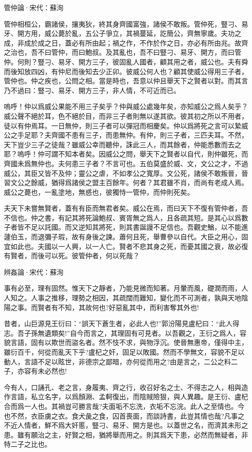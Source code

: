 \documentclass[12pt,a4paper]{ctexbook}
\begin{document}
管仲論·宋代：蘇洵 \par
管仲相桓公，霸諸侯，攘夷狄，終其身齊國富強，諸侯不敢叛。管仲死，豎刁、易牙、開方用，威公薨於亂，五公子爭立，其禍蔓延，訖簡公，齊無寧歲。夫功之成，非成於成之日，蓋必有所由起；禍之作，不作於作之日，亦必有所由兆。故齊之治也，吾不曰管仲，而曰鮑叔。及其亂也，吾不曰豎刁、易牙、開方，而曰管仲。何則？豎刁、易牙、開方三子，彼固亂人國者，顧其用之者，威公也。夫有舜而後知放四凶，有仲尼而後知去少正卯。彼威公何人也？顧其使威公得用三子者，管仲也。仲之疾也，公問之相。當是時也，吾意以仲且舉天下之賢者以對。而其言乃不過曰：豎刁、易牙、開方三子，非人情，不可近而已。\par
嗚呼！仲以爲威公果能不用三子矣乎？仲與威公處幾年矣，亦知威公之爲人矣乎？威公聲不絕於耳，色不絕於目，而非三子者則無以遂其欲。彼其初之所以不用者，徒以有仲焉耳。一日無仲，則三子者可以彈冠而相慶矣。仲以爲將死之言可以縶威公之手足耶？夫齊國不患有三子，而患無仲。有仲，則三子者，三匹夫耳。不然，天下豈少三子之徒哉？雖威公幸而聽仲，誅此三人，而其餘者，仲能悉數而去之耶？嗚呼！仲可謂不知本者矣。因威公之問，舉天下之賢者以自代，則仲雖死，而齊國未爲無仲也。夫何患三子者？不言可也。五伯莫盛於威、文，文公之才，不過威公，其臣又皆不及仲；靈公之虐，不如孝公之寬厚。文公死，諸侯不敢叛晉，晉習文公之餘威，猶得爲諸侯之盟主百餘年。何者？其君雖不肖，而尚有老成人焉。威公之薨也，一亂塗地，無惑也，彼獨恃一管仲，而仲則死矣。\par
夫天下未嘗無賢者，蓋有有臣而無君者矣。威公在焉，而曰天下不復有管仲者，吾不信也。仲之書，有記其將死論鮑叔、賓胥無之爲人，且各疏其短。是其心以爲數子者皆不足以託國。而又逆知其將死，則其書誕謾不足信也。吾觀史鰌，以不能進蘧伯玉，而退彌子瑕，故有身後之諫。蕭何且死，舉曹參以自代。大臣之用心，固宜如此也。夫國以一人興，以一人亡。賢者不悲其身之死，而憂其國之衰，故必復有賢者，而後可以死。彼管仲者，何以死哉？\par
辨姦論·宋代：蘇洵 \par
事有必至，理有固然。惟天下之靜者，乃能見微而知著。月暈而風，礎潤而雨，人人知之。人事之推移，理勢之相因，其疏闊而難知，變化而不可測者，孰與天地陰陽之事。而賢者有不知，其故何也?好惡亂其中，而利害奪其外也!\par
昔者，山巨源見王衍曰：“誤天下蒼生者，必此人也!”郭汾陽見盧杞曰：“此人得志。吾子孫無遺類矣!”自今而言之，其理固有可見者。以吾觀之，王衍之爲人，容貌言語，固有以欺世而盜名者。然不忮不求，與物浮沉。使晉無惠帝，僅得中主，雖衍百千，何從而亂天下乎?盧杞之奸，固足以敗國。然而不學無文，容貌不足以動人，言語不足以眩世，非德宗之鄙暗，亦何從而用之?由是言之，二公之料二子，亦容有未必然也!\par
今有人，口誦孔、老之言，身履夷、齊之行，收召好名之士、不得志之人，相與造作言語，私立名字，以爲顏淵、孟軻復出，而陰賊險狠，與人異趣。是王衍、盧杞合而爲一人也。其禍豈可勝言哉?夫面垢不忘洗，衣垢不忘浣。此人之至情也。今也不然，衣臣虜之衣。食犬彘之食，囚首喪面，而談詩書，此豈其情也哉?凡事之不近人情者，鮮不爲大奸慝，豎刁、易牙、開方是也。以蓋世之名，而濟其未形之患。雖有願治之主，好賢之相，猶將舉而用之。則其爲天下患，必然而無疑者，非特二子之比也。\par
\end{document}
